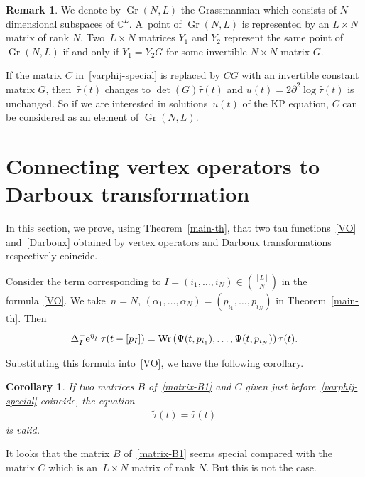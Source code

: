 \documentclass[10pt,a4paper]{amsart}
\numberwithin{equation}{section}
\newtheorem{Corollary}[Theorem]{Corollary}
\theoremstyle{definition}
\newtheorem{Remark}[Theorem]{Remark}
\begin{document}
\begin{Remark}\label{Grassmannian}
We denote by $\operatorname{Gr}(N,L)$ the Grassmannian which consists of $N$ dimensional
subspaces of ${\mathbb C}^L$. A~point of $\operatorname{Gr}(N,L)$ is represented by an
$L\times N$ matrix of rank $N$. Two~${L\times N}$ matrices $Y_1$ and $Y_2$ represent
the same point of $\operatorname{Gr}(N,L)$ if and only if $Y_1=Y_2G$ for some invertible $N\times N$
matrix $G$.

If the matrix $C$ in~\eqref{varphij-special} is replaced by $CG$ with an invertible constant matrix $G$, then~$\widehat{\tau}(t)$ changes to $\det(G)\widehat{\tau}(t)$ and
$u(t)=2\partial^2\log \widehat{\tau}(t)$ is unchanged. So if we are interested in
solutions~$u(t)$ of the KP equation, $C$ can be considered as an element
of $\operatorname{Gr}(N,L)$.
\end{Remark}








\section{Connecting vertex operators to Darboux transformation}\label{sec5}
In this section, we prove, using Theorem~\ref{main-th}, that two tau functions~\eqref{VO} and~\eqref{Darboux} obtained by
vertex operators and Darboux transformations respectively coincide.

Consider the term corresponding to
$ I=(i_1,\dots ,i_N)\in \binom{[L]}{N}$ in the formula~\eqref{VO}.
We take~${n=N}$, $(\alpha_1,\dots ,\alpha_N)=(p_{i_1},\dots ,p_{i_N})$ in Theorem~\ref{main-th}.
Then
\begin{gather*}
\Delta_I^{-}{\rm e}^{\eta_I^{-}}\tau(t-[p_I])=
 \operatorname{Wr}\left(\Psi(t,p_{i_1}),\dots ,\Psi(t,p_{i_N})\right)\tau(t).
 \end{gather*}

Substituting this formula into~\eqref{VO}, we have the following corollary.

\begin{Corollary}\label{VO-D-identity}
If two matrices $B$ of~\eqref{matrix-B1} and $C$ given just before~\eqref{varphij-special} coincide, the equation
\begin{gather}
\tilde{\tau}(t)=\widehat{\tau}(t)
\label{VO=Darboux}
\end{gather}
is valid.
\end{Corollary}

It looks that the matrix $B$ of~\eqref{matrix-B1} seems special compared with the matrix $C$ which is an~${L\times N}$ matrix of rank $N$.
But this is not the case.
\end{document}
